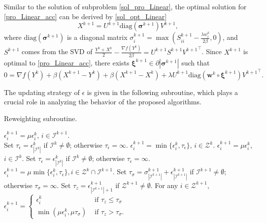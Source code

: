 \documentclass[twoside,11pt]{article}
\newcommand{\Ical}{\mathcal{I}}
\newcommand{\Zcal}{\mathcal{Z}}
\numberwithin{equation}{section}
\begin{document}
 Similar to the solution of subproblem    \eqref{sol_pro_Linear},    the optimal solution for \eqref{pro_Linear_acc} can be derived by  \eqref{sol_opt_Linear}
\begin{equation}
  X^{k+1} = U^{k+1}\text{diag}(\bm{\sigma}^{k+1})V^{k+1},
\end{equation}
where $\text{diag}(\bm{\sigma}^{k+1})$ is a diagonal matrix $\sigma^{k+1}_i = \max \left(S^{k+1}_{ii}-\frac{\lambda w_{i}^{k}}{2\beta},0\right)$, and $S^{k+1}$ comes from the SVD of  $\frac{Y^{k}+X^{k}}{2} -\frac{\nabla f (Y^{k})}{2\beta} = U^{k+1}S^{k+1}{V^{k+1}}^{\top} $. 
 Since $X^{k+1} $ is optimal to \eqref{pro_Linear_acc}, there exists $\bm{\xi}^{k+1}\in\partial|\bm{\sigma}^{k+1} | $ such that 
  \begin{equation}\label{KKT_acc_opt}
    0= \nabla f (Y^{k}) + \beta (X^{k+1}-Y^{k}) + \beta (X^{k+1} - X^{k}) + \lambda U^{k+1}\mathrm{diag} \left(\bm{w}^{k}\circ\bm{\xi}^{k+1}\right){V^{k+1}}^{\top}. 
  \end{equation}



The updating  strategy  of $\epsilon$ is given in the following subroutine, which plays a crucial role in analyzing the behavior 
of the proposed algorithms. 
  \begin{algorithm}[H] 
 \caption{Reweighting subroutine.}
 \label{update_eps} 
  \begin{algorithmic}[1]
   \IF{$\Ical^k \supset \Ical^{k+1}$} 
     \STATE   $\epsilon_{i}^{k+1} = \mu \epsilon_i^k$,   $ i \in  \Ical^{k+1}.$  \\
        \STATE  Set $\tau_\epsilon  =  \epsilon_{|\Ical^{k}|}^{k}$ if $\Ical^k \ne \emptyset$; otherwise $\tau_\epsilon  = \infty$. 
   \STATE $\epsilon_i^{k+1} = \min\{ \epsilon_i^k, \tau_\epsilon \}$, $i\in\Zcal^k$. 
    \ENDIF
   \IF{$\Ical^k \subset \Ical^{k+1}$} 
     \STATE   $\epsilon_{i}^{k+1} = \mu \epsilon_i^k$,   $ i \in \Ical^k.$
     \STATE  Set $\tau_\epsilon  =  \epsilon_{|\Ical^{k}|}^{k}$ if $\Ical^k \ne \emptyset$; otherwise $\tau_\epsilon  = \infty$. 
    \STATE $ \epsilon_{i}^{k+1} = \mu\min\{ \epsilon_i^k,  \tau_\epsilon \},   i\in\Zcal^k\cap\Ical^{k+1}$. 
    \ENDIF
            \STATE  Set $\tau_\sigma = \sigma_{|\Ical^{k+1}|}^{k+1} + \epsilon_{|\Ical^{k+1}|}^{k+1}$ if $\Ical^{k+1} \ne \emptyset$; otherwise $\tau_\sigma = \infty$. 
            \STATE  Set $\tau_z =  \epsilon_{|\Ical^{k+1}| + 1}^{k+1}$  if $\Zcal^{k+1} \ne \emptyset$.
     \STATE  For any $i\in \Zcal^{k+1}$,  $\epsilon_{i}^{k+1} = 
   \begin{cases} \epsilon_i^k  & \text{ if }  \tau_z \le \tau_\sigma \\
                        \min(\mu\epsilon_i^k,\mu\tau_\sigma) & \text{ if } \tau_z > \tau_\sigma. 
                      \end{cases}$

    \end{algorithmic}
   \end{algorithm}
\end{document}
